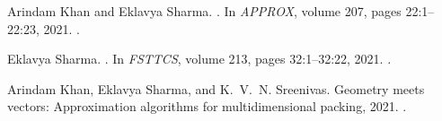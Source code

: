 

\frontmatter







\let\oldbibname\bibname
\renewcommand{\bibname}{Publications based on this Thesis}

\begin{thebibliography}{1}

Arindam Khan and Eklavya Sharma.
.
\newblock In {\em APPROX}, volume 207, pages 22:1--22:23, 2021.
\newblock \href {https://doi.org/10.4230/LIPIcs.APPROX/RANDOM.2021.22}
  {}.

Eklavya Sharma.
.
\newblock In {\em FSTTCS}, volume 213, pages 32:1--32:22, 2021.
\newblock \href {https://doi.org/10.4230/LIPIcs.FSTTCS.2021.32}
  {}.

Arindam Khan, Eklavya Sharma, and K.~V.~N. Sreenivas.
\newblock Geometry meets vectors: Approximation algorithms for multidimensional
  packing, 2021.
\newblock \href {http://arxiv.org/abs/2106.13951} {}.

\end{thebibliography}

\renewcommand{\bibname}{\oldbibname}
